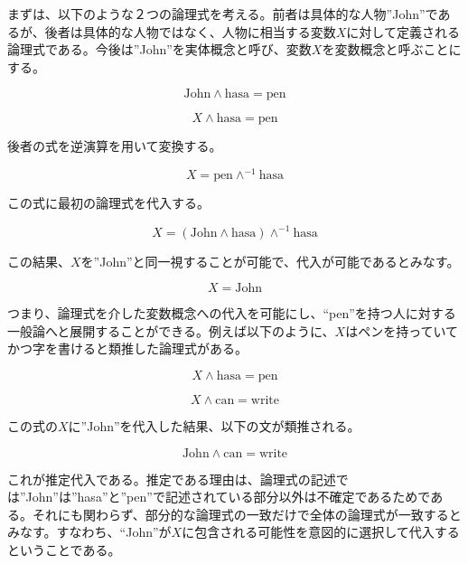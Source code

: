 \documentclass[12pt]{article}
\begin{document}
まずは、以下のような２つの論理式を考える。前者は具体的な人物''John''であるが、後者は具体的な人物ではなく、人物に相当する変数\(X\)に対して定義される論理式である。今後は''John''を実体概念と呼び、変数\(X\)を変数概念と呼ぶことにする。

\begin{equation} \text{John} \wedge \text{hasa} = \text{pen} \end{equation}

\begin{equation} X \wedge \text{hasa} = \text{pen} \end{equation}

後者の式を逆演算を用いて変換する。

\begin{equation} X = \text{pen} \wedge^{-1} \text{hasa}\end{equation}

この式に最初の論理式を代入する。

\begin{equation} X = (\text{John} \wedge \text{hasa}) \wedge^{-1} \text{hasa}\end{equation}

この結果、\(X\)を''John''と同一視することが可能で、代入が可能であるとみなす。

\begin{equation} X = \text{John} \end{equation}

つまり、論理式を介した変数概念への代入を可能にし、``pen''を持つ人に対する一般論へと展開することができる。例えば以下のように、\(X\)はペンを持っていてかつ字を書けると類推した論理式がある。

\begin{equation} X \wedge \text{hasa} = \text{pen} \end{equation}

\begin{equation} X \wedge \text{can} = \text{write}\end{equation}

この式の\(X\)に''John''を代入した結果、以下の文が類推される。

\begin{equation} \text{John} \wedge \text{can} = \text{write} \end{equation}

これが推定代入である。推定である理由は、論理式の記述では''John''は''hasa''と''pen''で記述されている部分以外は不確定であるためである。それにも関わらず、部分的な論理式の一致だけで全体の論理式が一致するとみなす。すなわち、``John''が\(X\)に包含される可能性を意図的に選択して代入するということである。
\end{document}

